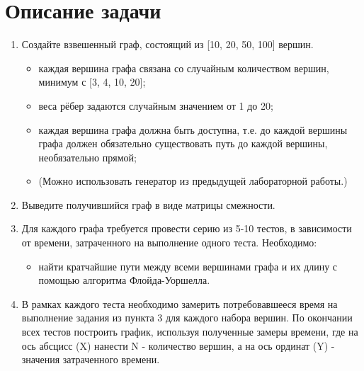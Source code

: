 \documentclass[12pt, a4paper]{report}
\begin{document}
	\section*{Описание задачи}
	\large
	\begin{enumerate}
		\item Создайте взвешенный граф, состоящий из [10, 20, 50, 100] вершин.
		\begin{itemize}
			\item каждая вершина графа связана со случайным количеством вершин, минимум с [3, 4, 10, 20];
			\item веса рёбер задаются случайным значением от 1 до 20;	
			\item каждая вершина графа должна быть доступна, т.е. до каждой вершины графа должен обязательно существовать путь до каждой вершины, необязательно прямой;
			\item (Можно использовать генератор из предыдущей лабораторной работы.)
		\end{itemize}
		\item Выведите получившийся граф в виде матрицы смежности.
		\item Для каждого графа требуется провести серию из 5-10 тестов, в зависимости от времени, затраченного на выполнение одного теста. Необходимо:
		\begin{itemize}
			\item найти кратчайшие пути между всеми вершинами графа и их длину с помощью алгоритма Флойда-Уоршелла.
		\end{itemize}
		\item В рамках каждого теста необходимо замерить потребовавшееся время на выполнение задания из пункта 3 для каждого набора вершин. По окончании всех тестов построить график, используя полученные замеры времени, где на ось абсцисс (X) нанести N - количество вершин, а на ось ординат (Y) - значения затраченного времени.
	\end{enumerate}

	\newpage
\end{document}

